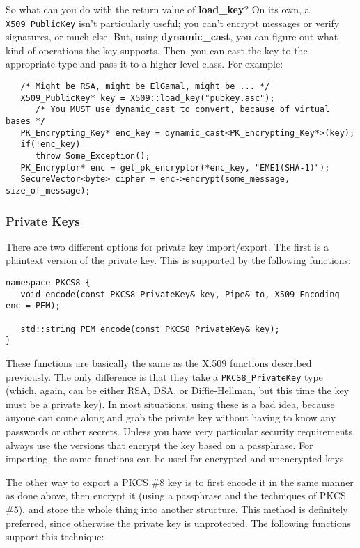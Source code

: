 \documentclass{article}
\newcommand{\function}[1]{\textbf{#1}}
\newcommand{\type}[1]{\texttt{#1}}
\begin{document}
So what can you do with the return value of \function{load\_key}? On its own, a
\type{X509\_PublicKey} isn't particularly useful; you can't encrypt messages or
verify signatures, or much else. But, using \function{dynamic\_cast}, you can
figure out what kind of operations the key supports. Then, you can cast the key
to the appropriate type and pass it to a higher-level class. For example:

\begin{verbatim}
   /* Might be RSA, might be ElGamal, might be ... */
   X509_PublicKey* key = X509::load_key("pubkey.asc");
      /* You MUST use dynamic_cast to convert, because of virtual bases */
   PK_Encrypting_Key* enc_key = dynamic_cast<PK_Encrypting_Key*>(key);
   if(!enc_key)
      throw Some_Exception();
   PK_Encryptor* enc = get_pk_encryptor(*enc_key, "EME1(SHA-1)");
   SecureVector<byte> cipher = enc->encrypt(some_message, size_of_message);
\end{verbatim}

\pagebreak

\subsubsection{Private Keys}

There are two different options for private key import/export. The first is a
plaintext version of the private key. This is supported by the following
functions:

\begin{verbatim}
namespace PKCS8 {
   void encode(const PKCS8_PrivateKey& key, Pipe& to, X509_Encoding enc = PEM);

   std::string PEM_encode(const PKCS8_PrivateKey& key);
}
\end{verbatim}

These functions are basically the same as the X.509 functions described
previously. The only difference is that they take a \type{PKCS8\_PrivateKey}
type (which, again, can be either RSA, DSA, or Diffie-Hellman, but this time
the key must be a private key). In most situations, using these is a bad idea,
because anyone can come along and grab the private key without having to know
any passwords or other secrets. Unless you have very particular security
requirements, always use the versions that encrypt the key based on a
passphrase. For importing, the same functions can be used for encrypted and
unencrypted keys.

The other way to export a PKCS \#8 key is to first encode it in the same manner
as done above, then encrypt it (using a passphrase and the techniques of PKCS
\#5), and store the whole thing into another structure. This method is
definitely preferred, since otherwise the private key is unprotected. The
following functions support this technique:
\end{document}
